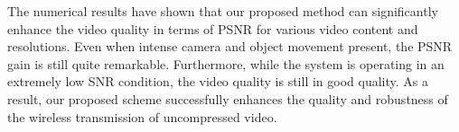 \documentclass[10pt,twocolumn,twoside]{IEEEtran}
\begin{document}
The numerical results have shown that our proposed method can significantly enhance the video quality in terms of PSNR for various video content and resolutions. Even when intense camera and object movement present, the PSNR gain is still quite remarkable. Furthermore, while the system is operating in an extremely low SNR condition, the video quality is still in good quality. As a result, our proposed scheme successfully enhances the quality and robustness of the wireless transmission of uncompressed video.





\ifCLASSOPTIONcaptionsoff
  \newpage
\fi







%
%
%

% 
\end{document}
